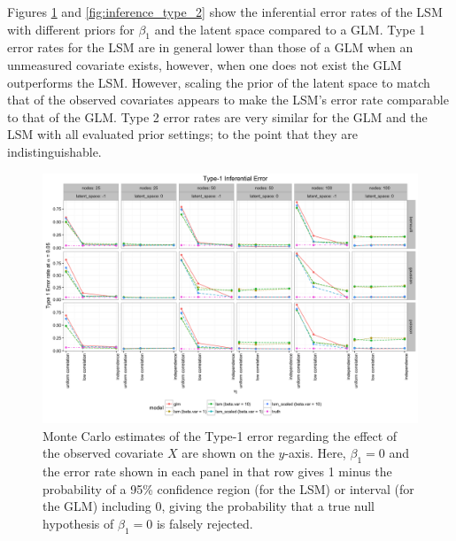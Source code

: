 \documentclass[12pt]{article}
\begin{document}
Figures \ref{fig:inference_type_1} and \ref{fig:inference_type_2} show the inferential error rates of the LSM with different priors for $\beta_1$ and the latent space compared to a GLM. Type 1 error rates for the LSM are in general lower than those of a GLM when an unmeasured covariate exists, however, when one does not exist the GLM outperforms the LSM. However, scaling the prior of the latent space to match that of the observed covariates appears to make the LSM's error rate comparable to that of the GLM. Type 2 error rates are very similar for the GLM and the LSM with all evaluated prior settings; to the point that they are indistinguishable.

\begin{figure}
\includegraphics[width=\textwidth]{inference_type_1.png}
\caption{Monte Carlo estimates of the Type-1 error regarding the effect of the observed covariate $X$ are shown on the $y$-axis. Here, $\beta_1 = 0$ and the error rate shown in each panel in that row gives 1 minus the probability of a 95\% confidence region (for the LSM) or interval (for the GLM) including $0$, giving the probability that a true null hypothesis of $\beta_1 = 0$ is falsely rejected. \label{fig:inference_type_1}}
\end{figure}
\end{document}
